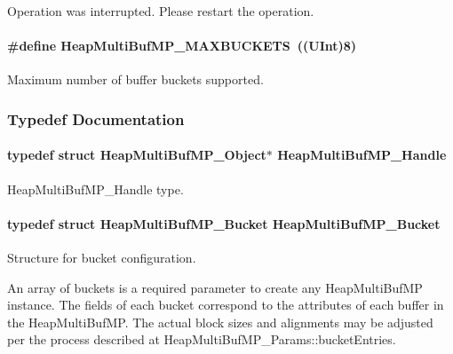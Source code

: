 Operation was interrupted. Please restart the operation. 

\paragraph[{HeapMultiBufMP\_\-MAXBUCKETS}]{\setlength{\rightskip}{0pt plus 5cm}\#define HeapMultiBufMP\_\-MAXBUCKETS~((UInt)8)}\hfill\label{_heap_multi_buf_m_p_8h_adf1fa817a6a12132b7293ec1fc1c8bf4}


Maximum number of buffer buckets supported. 



\subsubsection{Typedef Documentation}
\paragraph[{HeapMultiBufMP\_\-Handle}]{\setlength{\rightskip}{0pt plus 5cm}typedef struct HeapMultiBufMP\_\-Object$\ast$ {\bf HeapMultiBufMP\_\-Handle}}\hfill\label{_heap_multi_buf_m_p_8h_a84a0dbef1eb25a19072649a3c30ed4e6}


HeapMultiBufMP\_\-Handle type. 

\paragraph[{HeapMultiBufMP\_\-Bucket}]{\setlength{\rightskip}{0pt plus 5cm}typedef struct {\bf HeapMultiBufMP\_\-Bucket}  {\bf HeapMultiBufMP\_\-Bucket}}\hfill\label{_heap_multi_buf_m_p_8h_ae5ebd64bf1712fe348d9fa6ba7d93017}


Structure for bucket configuration. 

An array of buckets is a required parameter to create any HeapMultiBufMP instance. The fields of each bucket correspond to the attributes of each buffer in the HeapMultiBufMP. The actual block sizes and alignments may be adjusted per the process described at HeapMultiBufMP\_\-Params::bucketEntries. 
